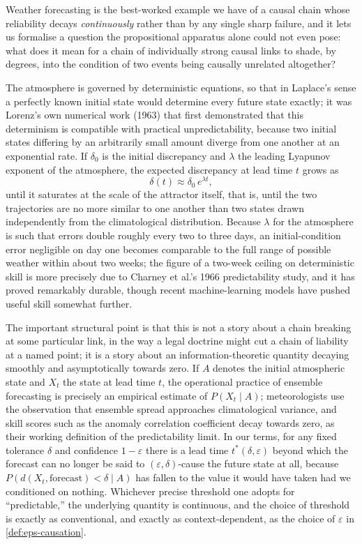 \documentclass[11pt]{article}
\theoremstyle{definition}
\newcommand{\eps}{\varepsilon}
\begin{document}
Weather forecasting is the best-worked example we have of a causal chain whose reliability decays \emph{continuously} rather than by any single sharp failure, and it lets us formalise a question the propositional apparatus alone could not even pose: what does it mean for a chain of individually strong causal links to shade, by degrees, into the condition of two events being causally unrelated altogether?

The atmosphere is governed by deterministic equations, so that in Laplace's sense a perfectly known initial state would determine every future state exactly; it was Lorenz's own numerical work (1963) that first demonstrated that this determinism is compatible with practical unpredictability, because two initial states differing by an arbitrarily small amount diverge from one another at an exponential rate. If $\delta_0$ is the initial discrepancy and $\lambda$ the leading Lyapunov exponent of the atmosphere, the expected discrepancy at lead time $t$ grows as
\[
\delta(t) \approx \delta_0\, e^{\lambda t},
\]
until it saturates at the scale of the attractor itself, that is, until the two trajectories are no more similar to one another than two states drawn independently from the climatological distribution. Because $\lambda$ for the atmosphere is such that errors double roughly every two to three days, an initial-condition error negligible on day one becomes comparable to the full range of possible weather within about two weeks; the figure of a two-week ceiling on deterministic skill is more precisely due to Charney et al.'s 1966 predictability study, and it has proved remarkably durable, though recent machine-learning models have pushed useful skill somewhat further.

The important structural point is that this is not a story about a chain breaking at some particular link, in the way a legal doctrine might cut a chain of liability at a named point; it is a story about an information-theoretic quantity decaying smoothly and asymptotically towards zero. If $A$ denotes the initial atmospheric state and $X_t$ the state at lead time $t$, the operational practice of ensemble forecasting is precisely an empirical estimate of $P(X_t \mid A)$; meteorologists use the observation that ensemble spread approaches climatological variance, and skill scores such as the anomaly correlation coefficient decay towards zero, as their working definition of the predictability limit. In our terms, for any fixed tolerance $\delta$ and confidence $1-\eps$ there is a lead time $t^*(\delta,\eps)$ beyond which the forecast can no longer be said to $(\eps,\delta)$-cause the future state at all, because $P(d(X_t,\text{forecast})<\delta \mid A)$ has fallen to the value it would have taken had we conditioned on nothing. Whichever precise threshold one adopts for ``predictable,'' the underlying quantity is continuous, and the choice of threshold is exactly as conventional, and exactly as context-dependent, as the choice of $\eps$ in \cref{def:eps-causation}.
\end{document}
